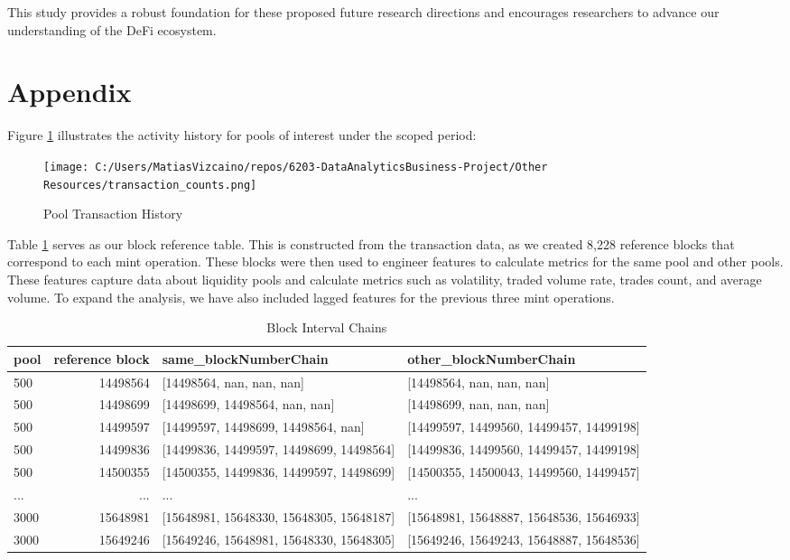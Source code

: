 \documentclass{article}
\begin{document}
This study provides a robust foundation for these proposed future research directions and encourages researchers to advance our understanding of the DeFi ecosystem.

\newpage
\section{Appendix}

Figure \ref{fig:pool-transactions} illustrates the activity history for pools of interest under the scoped period:

\begin{figure}[htbp]
  \centering
  \texttt{[image: C:/Users/MatiasVizcaino/repos/6203-DataAnalyticsBusiness-Project/Other Resources/transaction\_counts.png]}
  \caption{Pool Transaction History}
  \label{fig:pool-transactions}
\end{figure}

Table \ref{tab:chains} serves as our block reference table. This is constructed from the transaction data, as we created 8,228 reference blocks that correspond to each mint operation. These blocks were then used to engineer features to calculate metrics for the same pool and other pools. These features capture data about liquidity pools and calculate metrics such as volatility, traded volume rate, trades count, and average volume. To expand the analysis, we have also included lagged features for the previous three mint operations.

\begin{table}[htbp]
  \centering
  \small
  \begin{tabularx}{\linewidth}{|X|r|l|l|}
    \hline
    \textbf{pool} & \textbf{reference block} & \textbf{same\_blockNumberChain} & \textbf{other\_blockNumberChain} \\
    \hline
    500 & 14498564 & [14498564, nan, nan, nan] & [14498564, nan, nan, nan] \\
    500 & 14498699 & [14498699, 14498564, nan, nan] & [14498699, nan, nan, nan] \\
    500 & 14499597 & [14499597, 14498699, 14498564, nan] & [14499597, 14499560, 14499457, 14499198] \\
    500 & 14499836 & [14499836, 14499597, 14498699, 14498564] & [14499836, 14499560, 14499457, 14499198] \\
    500 & 14500355 & [14500355, 14499836, 14499597, 14498699] & [14500355, 14500043, 14499560, 14499457] \\
    ... & ... & ... & ... \\
    3000 & 15648981 & [15648981, 15648330, 15648305, 15648187] & [15648981, 15648887, 15648536, 15646933] \\
    3000 & 15649246 & [15649246, 15648981, 15648330, 15648305] & [15649246, 15649243, 15648887, 15648536] \\
    \hline
  \end{tabularx}
  \caption{Block Interval Chains}
  \label{tab:chains}
\end{table}
\end{document}
